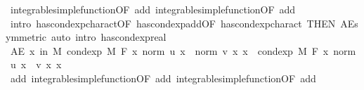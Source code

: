 \begin{isabellebody}
\ integrable{\isacharunderscore}{\kern0pt}simple{\isacharunderscore}{\kern0pt}function{\isacharbrackleft}{\kern0pt}OF\ add{\isacharparenleft}{\kern0pt}{}{\isacharcomma}{\kern0pt}{}{\isacharparenright}{\kern0pt}{\isacharbrackright}{\kern0pt}\ integrable{\isacharunderscore}{\kern0pt}simple{\isacharunderscore}{\kern0pt}function{\isacharbrackleft}{\kern0pt}OF\ add{\isacharparenleft}{\kern0pt}{}{\isacharcomma}{\kern0pt}{}{\isacharparenright}{\kern0pt}{\isacharbrackright}{\kern0pt}\ \isamarkupfalse%
\ {\isacharparenleft}{\kern0pt}intro\ has{\isacharunderscore}{\kern0pt}cond{\isacharunderscore}{\kern0pt}exp{\isacharunderscore}{\kern0pt}charact{\isacharparenleft}{\kern0pt}{}{\isacharparenright}{\kern0pt}{\isacharbrackleft}{\kern0pt}OF\ has{\isacharunderscore}{\kern0pt}cond{\isacharunderscore}{\kern0pt}exp{\isacharunderscore}{\kern0pt}add{\isacharbrackleft}{\kern0pt}OF\ has{\isacharunderscore}{\kern0pt}cond{\isacharunderscore}{\kern0pt}exp{\isacharunderscore}{\kern0pt}charact{\isacharparenleft}{\kern0pt}{}{\isacharcomma}{\kern0pt}{}{\isacharparenright}{\kern0pt}{\isacharbrackright}{\kern0pt}{\isacharcomma}{\kern0pt}\ THEN\ AE{\isacharunderscore}{\kern0pt}symmetric{\isacharbrackright}{\kern0pt}{\isacharcomma}{\kern0pt}\ auto\ intro{\isacharcolon}{\kern0pt}\ has{\isacharunderscore}{\kern0pt}cond{\isacharunderscore}{\kern0pt}exp{\isacharunderscore}{\kern0pt}real{\isacharparenright}{\kern0pt}\isanewline
\ \ \isamarkupfalse%
\ \isamarkupfalse%
\ {\isachardoublequoteopen}AE\ x\ in\ M{\isachardot}{\kern0pt}\ cond{\isacharunderscore}{\kern0pt}exp\ M\ F\ {\isacharparenleft}{\kern0pt}{\isasymlambda}x{\isachardot}{\kern0pt}\ norm\ {\isacharparenleft}{\kern0pt}u\ x{\isacharparenright}{\kern0pt}\ {\isacharplus}{\kern0pt}\ norm\ {\isacharparenleft}{\kern0pt}v\ x{\isacharparenright}{\kern0pt}{\isacharparenright}{\kern0pt}\ x\ {\isacharequal}{\kern0pt}\ cond{\isacharunderscore}{\kern0pt}exp\ M\ F\ {\isacharparenleft}{\kern0pt}{\isasymlambda}x{\isachardot}{\kern0pt}\ norm\ {\isacharparenleft}{\kern0pt}u\ x\ {\isacharplus}{\kern0pt}\ v\ x{\isacharparenright}{\kern0pt}{\isacharparenright}{\kern0pt}\ x{\isachardoublequoteclose}\ \isamarkupfalse%
\ add{\isacharparenleft}{\kern0pt}{}{\isacharparenright}{\kern0pt}\ integrable{\isacharunderscore}{\kern0pt}simple{\isacharunderscore}{\kern0pt}function{\isacharbrackleft}{\kern0pt}OF\ add{\isacharparenleft}{\kern0pt}{}{\isacharcomma}{\kern0pt}{}{\isacharparenright}{\kern0pt}{\isacharbrackright}{\kern0pt}\ integrable{\isacharunderscore}{\kern0pt}simple{\isacharunderscore}{\kern0pt}function{\isacharbrackleft}{\kern0pt}OF\ add{\isacharparenleft}{\kern0pt}{}{\isacharcomma}{\kern0pt}{}{\isacharparenright}{\kern0pt}{\isacharbrackright}{\kern0pt}\ \isamarkupfalse%

\end{isabellebody}
